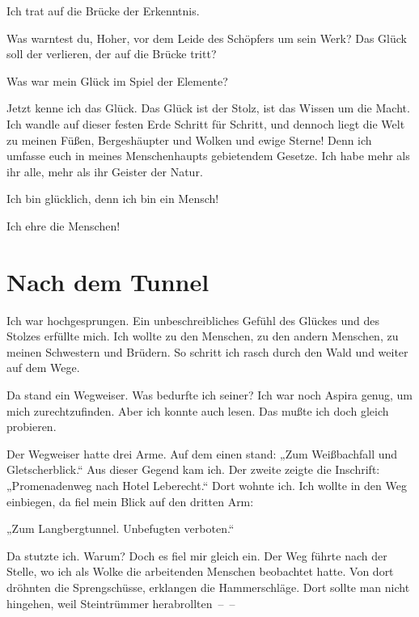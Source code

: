 Ich trat auf die Brücke der Erkenntnis.

Was warntest du, Hoher, vor dem Leide des Schöpfers um sein Werk?
Das Glück soll der verlieren, der auf die Brücke tritt?

Was war mein Glück im Spiel der Elemente?

Jetzt kenne ich das Glück. Das Glück ist der Stolz, ist das Wissen
um die Macht. Ich wandle auf dieser festen Erde Schritt für
Schritt, und dennoch liegt die Welt zu meinen Füßen, Bergeshäupter
und Wolken und ewige Sterne! Denn ich umfasse euch in meines
Menschenhaupts gebietendem Gesetze. Ich habe mehr als ihr alle,
mehr als ihr Geister der Natur.

Ich bin glücklich, denn ich bin ein Mensch!

Ich ehre die Menschen!

\section{Nach dem Tunnel \ausaspirastagebuch}


Ich war hochgesprungen. Ein unbeschreibliches Gefühl des Glückes
und des Stolzes erfüllte mich. Ich wollte zu den Menschen, zu den
andern Menschen, zu meinen Schwestern und Brüdern. So schritt ich
rasch durch den Wald und weiter auf dem Wege.

Da stand ein Wegweiser. Was bedurfte ich seiner? Ich war noch
Aspira genug, um mich zurechtzufinden. Aber ich konnte auch lesen.
Das mußte ich doch gleich probieren.

Der Wegweiser hatte drei Arme. Auf dem einen stand: „Zum
Weißbachfall und Gletscherblick.“ Aus dieser Gegend kam ich. Der
zweite zeigte die Inschrift: „Promenadenweg nach Hotel Leberecht.“
Dort wohnte ich. Ich wollte in den Weg einbiegen, da fiel mein
Blick auf den dritten Arm:

„Zum Langbergtunnel. Unbefugten verboten.“

Da stutzte ich. Warum? Doch es fiel mir gleich ein. Der Weg führte
nach der Stelle, wo ich als Wolke die arbeitenden Menschen
beobachtet hatte. Von dort dröhnten die Sprengschüsse, erklangen
die Hammerschläge. Dort sollte man nicht hingehen, weil
Steintrümmer herabrollten~–~–

